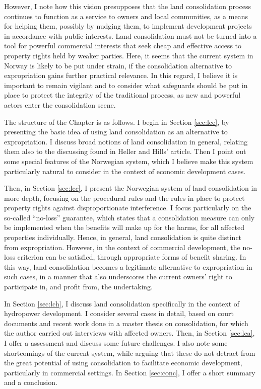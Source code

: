 However, I note how this vision presupposes that the land consolidation process continues to function as a service to owners and local communities, as a means for helping them, possibly by nudging them, to implement development projects in accordance with public interests. Land consolidation must not be turned into a tool for powerful commercial interests that seek cheap and effective access to property rights held by weaker parties. Here, it seems that the current system in Norway is likely to be put under strain, if the consolidation alternative to expropriation gains further practical relevance. In this regard, I believe it is important to remain vigilant and to consider what safeguards should be put in place to protect the integrity of the traditional process, as new and powerful actors enter the consolidation scene.

The structure of the Chapter is as follows. I begin in Section \ref{sec:lce}, by presenting the basic idea of using land consolidation as an alternative to expropriation. I discuss broad notions of land consolidation in general, relating them also to the discussing found in Heller and Hills' article. Then I point out some special features of the Norwegian system, which I believe make this system particularly natural to consider in the context of economic development cases. 

Then, in Section \ref{sec:lcc}, I present the Norwegian system of land consolidation in more depth, focusing on the procedural rules and the rules in place to protect property rights against disproportionate interference. I focus particularly on the so-called ``no-loss'' guarantee, which states that a consolidation measure can only be implemented when the benefits will make up for the harms, for all affected properties individually. Hence, in general, land consolidation is quite distinct from expropriation. However, in the context of commercial development, the no-loss criterion can be satisfied, through appropriate forms of benefit sharing. In this way, land consolidation becomes a legitimate alternative to expropriation in such cases, in a manner that also underscores the current owners' right to participate in, and profit from, the undertaking.

In Section \ref{sec:lch}, I discuss land consolidation specifically in the context of hydropower development. I consider several cases in detail, based on court documents and recent work done in a master thesis on consolidation, for which the author carried out interviews with affected owners. Then, in Section \ref{sec:lca}, I offer a assessment and discuss some future challenges. I also note some shortcomings of the current system, while arguing that these do not detract from the great potential of using consolidation to facilitate economic development, particularly in commercial settings. In Section  \ref{sec:conc}, I offer a short summary and a conclusion.


